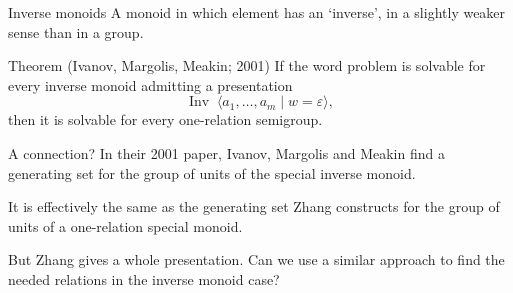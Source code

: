 \documentclass[]{beamer}
\let\epsilon\varepsilon
\newcommand{\Inv}{\operatorname{Inv}\;}
\newcommand{\pskip}{\medskip}
\begin{document}
\begin{frame}{Inverse monoids}
	A monoid in which element has an `inverse', in a slightly weaker sense than in a group.

	\pause
	\begin{block}{Theorem (Ivanov, Margolis, Meakin; 2001)}
		If the word problem is solvable for every inverse monoid admitting a presentation
			\[ \Inv \langle a_1, \ldots, a_m \mid w = \epsilon \rangle, \]
		then it is solvable for every one-relation semigroup.
	\end{block}
\end{frame}

\begin{frame}{A connection?}
	In their 2001 paper, Ivanov, Margolis and Meakin find a generating set for the group of units of the special inverse monoid.\pskip
	
	It is effectively the same as the generating set Zhang constructs for the group of units of a one-relation special monoid.\pskip

	But Zhang gives a whole presentation. Can we use a similar approach to find the needed relations in the inverse monoid case?
\end{frame}
\end{document}
